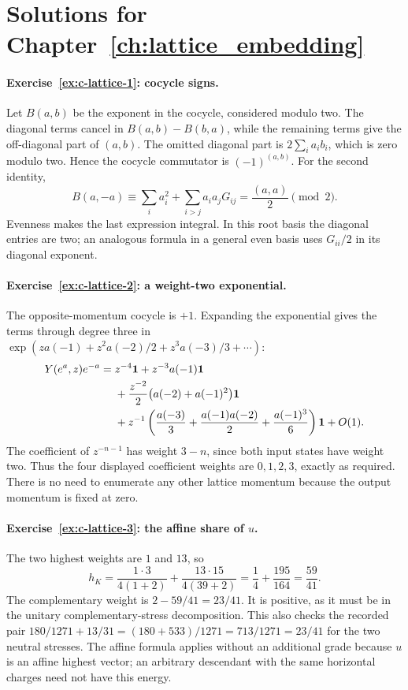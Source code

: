 \section{Solutions for Chapter~\ref{ch:lattice_embedding}}

\paragraph{Exercise~\ref{ex:c-lattice-1}: cocycle signs.}
\label{sol:ex:c-lattice-1}
Let $B(a,b)$ be the exponent in the cocycle, considered modulo two.
The diagonal terms cancel in $B(a,b)-B(b,a)$, while the remaining
terms give the off-diagonal part of $(a,b)$. The omitted diagonal
part is $2\sum_i a_ib_i$, which is zero modulo two. Hence the
cocycle commutator is $(-1)^{(a,b)}$. For the second identity,
\[
 B(a,-a)\equiv\sum_i a_i^2+\sum_{i>j}a_i a_jG_{ij}
                  =\frac{(a,a)}2\pmod2.
\]
Evenness makes the last expression integral. In this root basis the
diagonal entries are two; an analogous formula in a general even
basis uses $G_{ii}/2$ in its diagonal exponent.



\paragraph{Exercise~\ref{ex:c-lattice-2}: a weight-two exponential.}
\label{sol:ex:c-lattice-2}
The opposite-momentum cocycle is $+1$. Expanding the exponential gives
the terms through degree three in
$\exp(za(-1)+z^2a(-2)/2+z^3a(-3)/3+\cdots)$:
\begin{align*}
 Y(e^a,z)e^{-a}={}&z^{-4}\mathbf1+z^{-3}a(-1)\mathbf1\\
 &+\frac{z^{-2}}2\bigl(a(-2)+a(-1)^2\bigr)\mathbf1\\
 &+z^{-1}\left(\frac{a(-3)}3+\frac{a(-1)a(-2)}2
                              +\frac{a(-1)^3}{6}\right)\mathbf1+O(1).
\end{align*}
The coefficient of $z^{-n-1}$ has weight $3-n$, since both input
states have weight two. Thus the four displayed coefficient weights
are $0,1,2,3$, exactly as required. There is no need to enumerate any
other lattice momentum because the output momentum is fixed at zero.



\paragraph{Exercise~\ref{ex:c-lattice-3}: the affine share of $u$.}
\label{sol:ex:c-lattice-3}
The two highest weights are $1$ and $13$, so
\[
 h_K=\frac{1\cdot3}{4(1+2)}
       +\frac{13\cdot15}{4(39+2)}
     =\frac14+\frac{195}{164}=\frac{59}{41}.
\]
The complementary weight is $2-59/41=23/41$. It is positive, as
it must be in the unitary complementary-stress decomposition.
This also checks the recorded pair
$180/1271+13/31=(180+533)/1271=713/1271=23/41$
for the two neutral stresses. The affine formula applies without
an additional grade because $u$ is an affine highest vector;
an arbitrary descendant with the same horizontal charges need not
have this energy.



